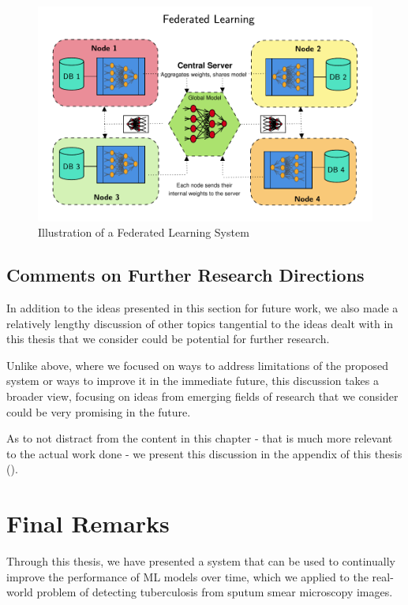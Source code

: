 \documentclass[../main.tex]{subfiles}
\begin{document}
    \begin{figure}
        \centering
        \includegraphics[width=0.85\linewidth]{figures/federated.pdf}
        \caption{Illustration of a Federated Learning System}
        \label{fig:federated}
    \end{figure}



    \subsection{Comments on Further Research Directions} \label{conclusions:research_directions}

    In addition to the ideas presented in this section for future work, we also made a relatively lengthy discussion of other topics tangential to the ideas dealt with in this thesis that we consider could be potential for further research. 
    
    Unlike above, where we focused on ways to address limitations of the proposed system or ways to improve it in the immediate future, this discussion takes a broader view, focusing on ideas from emerging fields of research that we consider could be very promising in the future.
    
    As to not distract from the content in this chapter - that is much more relevant to the actual work done -  we present this discussion in the appendix of this thesis ().
    

    \section{Final Remarks} \label{conclusions:final_remarks} 
    
    Through this thesis, we have presented a system that can be used to continually improve the performance of ML models over time, which we applied to the real-world problem of detecting tuberculosis from sputum smear microscopy images.
\end{document}
